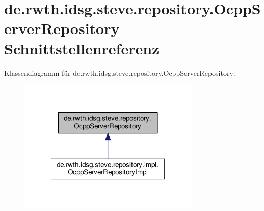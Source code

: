 \hypertarget{interfacede_1_1rwth_1_1idsg_1_1steve_1_1repository_1_1_ocpp_server_repository}{\section{de.\-rwth.\-idsg.\-steve.\-repository.\-Ocpp\-Server\-Repository Schnittstellenreferenz}
\label{interfacede_1_1rwth_1_1idsg_1_1steve_1_1repository_1_1_ocpp_server_repository}
}


Klassendiagramm für de.\-rwth.\-idsg.\-steve.\-repository.\-Ocpp\-Server\-Repository\-:\nopagebreak
\begin{figure}[H]
\begin{center}
\leavevmode
\includegraphics[width=246pt]{interfacede_1_1rwth_1_1idsg_1_1steve_1_1repository_1_1_ocpp_server_repository__inherit__graph}
\end{center}
\end{figure}
